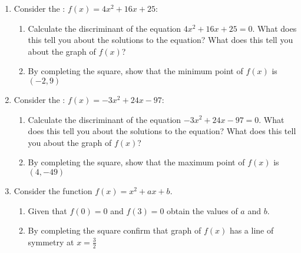\begin{enumerate}
\begin{enumerate}
\end{enumerate}

\item 

Consider the : \(f(x)=4x ^ 2 + 16x + 25\):
\begin{enumerate}

\item 

Calculate the discriminant of the  equation \(4x ^ 2 + 16x + 25 =
0\). What does this tell you about the solutions to the equation? What
does this tell you about the graph of \(f(x)\)?

\item 

By completing the square, show that the minimum point of \(f(x)\) is
\(\left(-2, 9\right)\)

\end{enumerate}

\item 

Consider the : \(f(x)=-3x ^ 2 + 24x - 97\):
\begin{enumerate}

\item 

Calculate the discriminant of the  equation \(-3x ^ 2 + 24x - 97 =
0\). What does this tell you about the solutions to the equation? What
does this tell you about the graph of \(f(x)\)?

\item 

By completing the square, show that the maximum point of \(f(x)\) is
\(\left(4, -49\right)\)

\end{enumerate}

\item 

Consider the function \(f(x) = x^ 2 + a x + b\).
\begin{enumerate}

\item 

Given that \(f(0) = 0\) and \(f(3) = 0\) obtain the values of \(a\) and \(b\).

\item 

By completing the square confirm that graph of \(f(x)\) has a line of symmetry at \(x=\frac{3}{2}\)

\end{enumerate}

\end{enumerate}

